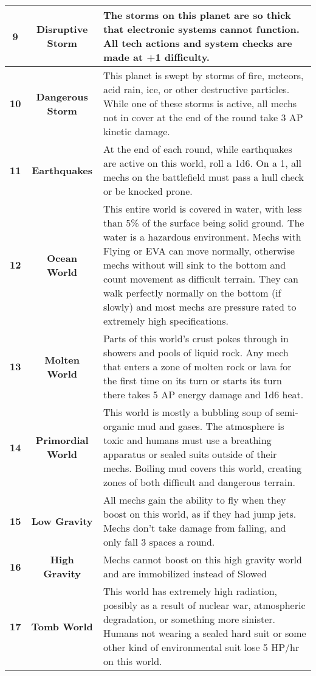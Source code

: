 \begin{longtable}{|c|c|p{10cm}|}
    \textbf{9} & \textbf{Disruptive Storm} & The storms on this planet are so thick that electronic systems cannot function. All tech actions and system checks are made at +1 difficulty.\\ \hline
    \textbf{10} & \textbf{Dangerous Storm} & This planet is swept by storms of fire, meteors, acid rain, ice, or other destructive particles. While one of these storms is active, all mechs not in cover at the end of the round take 3 AP kinetic damage.\\ \hline
    \textbf{11} & \textbf{Earthquakes} & At the end of each round, while earthquakes are active on this world, roll a 1d6. On a 1, all mechs on the battlefield must pass a hull check or be knocked prone.\\ \hline
    \textbf{12} & \textbf{Ocean World} & This entire world is covered in water, with less than 5\% of the surface being solid ground. The water is a hazardous environment. Mechs with Flying or EVA can move normally, otherwise mechs without will sink to the bottom and count movement as difficult terrain. They can walk perfectly normally on the bottom (if slowly) and most mechs are pressure rated to extremely high specifications.\\ \hline
    \textbf{13} & \textbf{Molten World} & Parts of this world’s crust pokes through in showers and pools of liquid rock. Any mech that enters a zone of molten rock or lava for the first time on its turn or starts its turn there takes 5 AP energy damage and 1d6 heat.\\ \hline
    \textbf{14} & \textbf{Primordial World} & This world is mostly a bubbling soup of semi-organic mud and gases. The atmosphere is toxic and humans must use a breathing apparatus or sealed suits outside of their mechs. Boiling mud covers this world, creating zones of both difficult and dangerous terrain.\\ \hline
    \textbf{15} & \textbf{Low Gravity} & All mechs gain the ability to fly when they boost on this world, as if they had jump jets. Mechs don’t take damage from falling, and only fall 3 spaces a round.\\ \hline
    \textbf{16} & \textbf{High Gravity} & Mechs cannot boost on this high gravity world and are immobilized instead of Slowed \\ \hline
    \textbf{17} & \textbf{Tomb World} & This world has extremely high radiation, possibly as a result of nuclear war, atmospheric degradation, or something more sinister. Humans not wearing a sealed hard suit or some other kind of environmental suit lose 5 HP/hr on this world.\\ \hline

\end{longtable}
